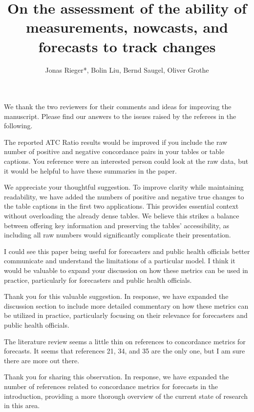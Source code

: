 \documentclass[12pt]{journalrebuttal}
\title{On the assessment of the ability of measurements, nowcasts, and forecasts to track changes}
\author{Jonas Rieger*, Bolin Liu, Bernd Saugel, Oliver Grothe}
\begin{document}
\maketitle

We thank the two reviewers for their comments and ideas for improving the manuscript. 
Please find our answers to the issues raised by the referees in the following.


\nextreviewer

\begin{revcomment}
	The reported ATC Ratio results would be improved if you include the raw number of positive and negative concordance pairs in your tables or table captions. You reference were an interested person could look at the raw data, but it would be helpful to have these summaries in the paper.
\end{revcomment}
\begin{response}
    We appreciate your thoughtful suggestion. To improve clarity while maintaining readability, we have added the numbers of positive and negative true changes to the table captions in the first two applications. This provides essential context without overloading the already dense tables. We believe this strikes a balance between offering key information and preserving the tables' accessibility, as including all raw numbers would significantly complicate their presentation.
\end{response}

\begin{revcomment}
I could see this paper being useful for forecasters and public health officials better communicate and understand the limitations of a particular model. I think it would be valuable to expand your discussion on how these metrics can be used in practice, particularly for forecasters and public health officials.
\end{revcomment}
\begin{response}
    Thank you for this valuable suggestion. In response, we have expanded the discussion section to include more detailed commentary on how these metrics can be utilized in practice, particularly focusing on their relevance for forecasters and public health officials.
\end{response}

\begin{revcomment}
The literature review seems a little thin on references to concordance metrics for forecasts. It seems that references 21, 34, and 35 are the only one, but I am sure there are more out there.
\end{revcomment}
\begin{response}
    Thank you for sharing this observation. In response, we have expanded the number of references related to concordance metrics for forecasts in the introduction, providing a more thorough overview of the current state of research in this area.
\end{response}
\end{document}
